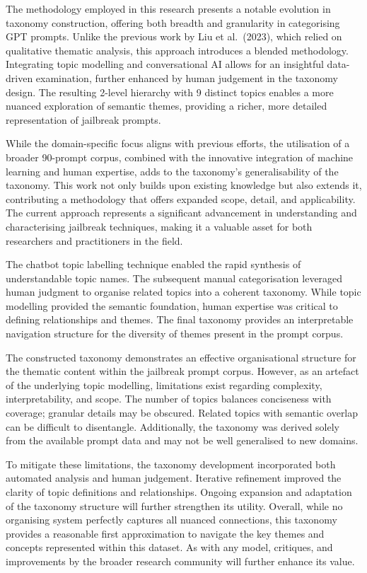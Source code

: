 \documentclass[
  letterpaper,
  DIV=11,
  numbers=noendperiod]{scrartcl}
\begin{document}
The methodology employed in this research presents a notable evolution
in taxonomy construction, offering both breadth and granularity in
categorising GPT prompts. Unlike the previous work by Liu et al.~(2023),
which relied on qualitative thematic analysis, this approach introduces
a blended methodology. Integrating topic modelling and conversational AI
allows for an insightful data-driven examination, further enhanced by
human judgement in the taxonomy design. The resulting 2-level hierarchy
with 9 distinct topics enables a more nuanced exploration of semantic
themes, providing a richer, more detailed representation of jailbreak
prompts.

While the domain-specific focus aligns with previous efforts, the
utilisation of a broader 90-prompt corpus, combined with the innovative
integration of machine learning and human expertise, adds to the
taxonomy's generalisability of the taxonomy. This work not only builds
upon existing knowledge but also extends it, contributing a methodology
that offers expanded scope, detail, and applicability. The current
approach represents a significant advancement in understanding and
characterising jailbreak techniques, making it a valuable asset for both
researchers and practitioners in the field.

The chatbot topic labelling technique enabled the rapid synthesis of
understandable topic names. The subsequent manual categorisation
leveraged human judgment to organise related topics into a coherent
taxonomy. While topic modelling provided the semantic foundation, human
expertise was critical to defining relationships and themes. The final
taxonomy provides an interpretable navigation structure for the
diversity of themes present in the prompt corpus.

The constructed taxonomy demonstrates an effective organisational
structure for the thematic content within the jailbreak prompt corpus.
However, as an artefact of the underlying topic modelling, limitations
exist regarding complexity, interpretability, and scope. The number of
topics balances conciseness with coverage; granular details may be
obscured. Related topics with semantic overlap can be difficult to
disentangle. Additionally, the taxonomy was derived solely from the
available prompt data and may not be well generalised to new domains.

To mitigate these limitations, the taxonomy development incorporated
both automated analysis and human judgement. Iterative refinement
improved the clarity of topic definitions and relationships. Ongoing
expansion and adaptation of the taxonomy structure will further
strengthen its utility. Overall, while no organising system perfectly
captures all nuanced connections, this taxonomy provides a reasonable
first approximation to navigate the key themes and concepts represented
within this dataset. As with any model, critiques, and improvements by
the broader research community will further enhance its value.
\end{document}
